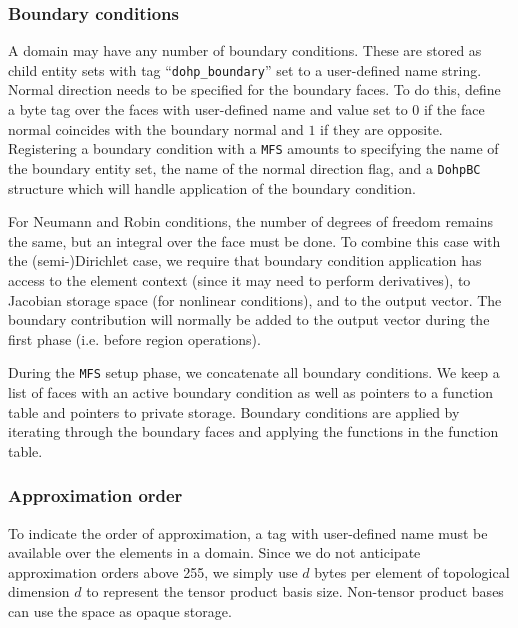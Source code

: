 \documentclass[a4paper]{article}
\newcommand{\trl}[1]{\texttt{#1}}
\begin{document}
\subsubsection{Boundary conditions}
A domain may have any number of boundary conditions.  These are stored as child entity sets with tag
``\trl{dohp\_boundary}'' set to a user-defined name string.  Normal direction needs to be specified for the boundary
faces.  To do this, define a byte tag over the faces with user-defined name and value set to $0$ if the face normal
coincides with the boundary normal and $1$ if they are opposite.  Registering a boundary condition with a \trl{MFS}
amounts to specifying the name of the boundary entity set, the name of the normal direction flag, and a
\trl{DohpBC} structure which will handle application of the boundary condition.

For Neumann and Robin conditions, the number of degrees of freedom remains the same, but an integral over the face must
be done.  To combine this case with the (semi-)Dirichlet case, we require that boundary condition application has access
to the element context (since it may need to perform derivatives), to Jacobian storage space (for nonlinear conditions),
and to the output vector.  The boundary contribution will normally be added to the output vector during the first phase
(i.e. before region operations).

During the \trl{MFS} setup phase, we concatenate all boundary conditions.  We keep a list of faces with an active
boundary condition as well as pointers to a function table and pointers to private storage.  Boundary conditions are
applied by iterating through the boundary faces and applying the functions in the function table.

\subsubsection{Approximation order}
To indicate the order of approximation, a tag with user-defined name must be available over the elements in a domain.
Since we do not anticipate approximation orders above 255, we simply use $d$ bytes per element of topological dimension
$d$ to represent the tensor product basis size.  Non-tensor product bases can use the space as opaque storage.
\end{document}
